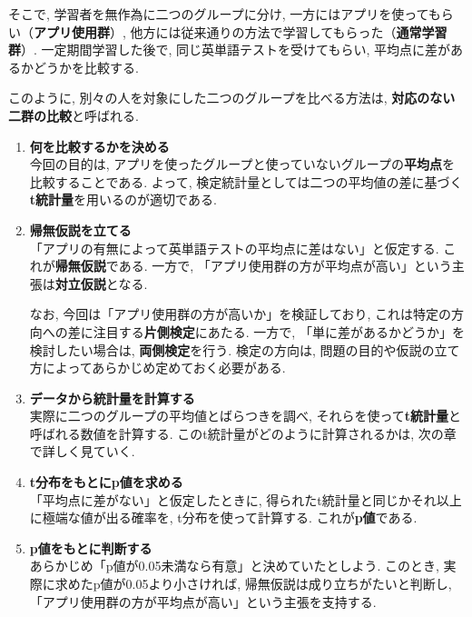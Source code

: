     そこで, 学習者を無作為に二つのグループに分け,
    一方にはアプリを使ってもらい（\textbf{アプリ使用群}）,
    他方には従来通りの方法で学習してもらった（\textbf{通常学習群}）.
    一定期間学習した後で, 同じ英単語テストを受けてもらい, 平均点に差があるかどうかを比較する.

    このように, 別々の人を対象にした二つのグループを比べる方法は,
    \textbf{対応のない二群の比較}と呼ばれる.

    \begin{enumerate}
      \item \textbf{何を比較するかを決める} \\
        今回の目的は, アプリを使ったグループと使っていないグループの\textbf{平均点}を比較することである.
        よって, 検定統計量としては二つの平均値の差に基づく\textbf{t統計量}を用いるのが適切である.

      \item \textbf{帰無仮説を立てる} \\
        「アプリの有無によって英単語テストの平均点に差はない」と仮定する.
        これが\textbf{帰無仮説}である.
        一方で, 「アプリ使用群の方が平均点が高い」という主張は\textbf{対立仮説}となる.

        なお, 今回は「アプリ使用群の方が高いか」を検証しており,
        これは特定の方向への差に注目する\textbf{片側検定}にあたる.
        一方で, 「単に差があるかどうか」を検討したい場合は,
        \textbf{両側検定}を行う.
        検定の方向は, 問題の目的や仮説の立て方によってあらかじめ定めておく必要がある.

      \item \textbf{データから統計量を計算する} \\
        実際に二つのグループの平均値とばらつきを調べ,
        それらを使って\textbf{t統計量}と呼ばれる数値を計算する.
        このt統計量がどのように計算されるかは, 次の章で詳しく見ていく.

      \item \textbf{t分布をもとにp値を求める} \\
        「平均点に差がない」と仮定したときに,
        得られたt統計量と同じかそれ以上に極端な値が出る確率を,
        t分布を使って計算する.
        これが\textbf{p値}である.

      \item \textbf{p値をもとに判断する} \\
        あらかじめ「p値が0.05未満なら有意」と決めていたとしよう.
        このとき, 実際に求めたp値が0.05より小さければ,
        帰無仮説は成り立ちがたいと判断し,
        「アプリ使用群の方が平均点が高い」という主張を支持する.
    \end{enumerate}

